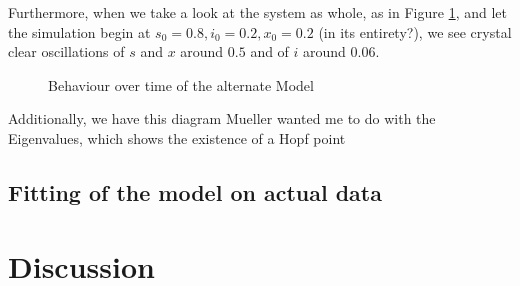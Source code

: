 \documentclass[12pt,a4paper,twoside]{article}
\begin{document}
Furthermore, when we take a look at the system as whole, as in Figure \ref{fig:time_behaviour_my_model}, and let the simulation begin at $s_0 = 0.8, i_0 = 0.2, x_0 = 0.2$ (in its entirety?), we see crystal clear oscillations of $s$ and $x$ around $0.5$ and of $i$ around $0.06$.

\begin{figure}[h!]
	\centering
	\caption{Behaviour over time of the alternate Model}
	\label{fig:time_behaviour_my_model}
	\def\svgwidth{350pt}
	
\end{figure}

Additionally, we have this diagram Mueller wanted me to do with the Eigenvalues, which shows the existence of a Hopf point %


\subsection{Fitting of the model on actual data}

\section{Discussion}


\newpage
\printbibliography
\end{document}
